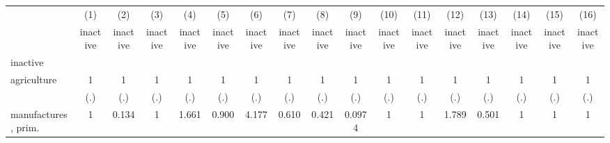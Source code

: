 {
\def\sym#1{\ifmmode^{#1}\else\(^{#1}\)\fi}
\begin{tabular}{l*{16}{c}}
\hline\hline
                    &\multicolumn{1}{c}{(1)}&\multicolumn{1}{c}{(2)}&\multicolumn{1}{c}{(3)}&\multicolumn{1}{c}{(4)}&\multicolumn{1}{c}{(5)}&\multicolumn{1}{c}{(6)}&\multicolumn{1}{c}{(7)}&\multicolumn{1}{c}{(8)}&\multicolumn{1}{c}{(9)}&\multicolumn{1}{c}{(10)}&\multicolumn{1}{c}{(11)}&\multicolumn{1}{c}{(12)}&\multicolumn{1}{c}{(13)}&\multicolumn{1}{c}{(14)}&\multicolumn{1}{c}{(15)}&\multicolumn{1}{c}{(16)}\\
                    &\multicolumn{1}{c}{inactive}&\multicolumn{1}{c}{inactive}&\multicolumn{1}{c}{inactive}&\multicolumn{1}{c}{inactive}&\multicolumn{1}{c}{inactive}&\multicolumn{1}{c}{inactive}&\multicolumn{1}{c}{inactive}&\multicolumn{1}{c}{inactive}&\multicolumn{1}{c}{inactive}&\multicolumn{1}{c}{inactive}&\multicolumn{1}{c}{inactive}&\multicolumn{1}{c}{inactive}&\multicolumn{1}{c}{inactive}&\multicolumn{1}{c}{inactive}&\multicolumn{1}{c}{inactive}&\multicolumn{1}{c}{inactive}\\
\hline
inactive            &                     &                     &                     &                     &                     &                     &                     &                     &                     &                     &                     &                     &                     &                     &                     &                     \\
agriculture         &           1         &           1         &           1         &           1         &           1         &           1         &           1         &           1         &           1         &           1         &           1         &           1         &           1         &           1         &           1         &           1         \\
                    &         (.)         &         (.)         &         (.)         &         (.)         &         (.)         &         (.)         &         (.)         &         (.)         &         (.)         &         (.)         &         (.)         &         (.)         &         (.)         &         (.)         &         (.)         &         (.)         \\
[1em]
manufactures, prim. &           1         &       0.134         &           1         &       1.661         &       0.900         &       4.177         &       0.610         &       0.421         &      0.0974         &           1         &           1         &       1.789         &       0.501         &           1         &           1         &           1         \\

\end{tabular}}
